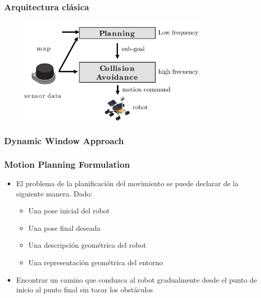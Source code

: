 \begin{frame}
	\frametitle{Arquitectura clásica}
	
	\begin{figure}[!h]
		\includegraphics[width=0.8\textwidth]{images/path_planning_architecture.pdf}
	\end{figure}
	
\end{frame}


\begin{frame}
	\frametitle{Dynamic Window Approach}
	
\end{frame}

\begin{frame}
	\frametitle{Motion Planning Formulation}

	\begin{itemize}
		\item El problema de la planificación del movimiento se puede declarar de la siguiente manera. Dado:
		\begin{itemize}
			\item Una pose inicial del robot
			\item Una pose final deseada
			\item Una descripción geométrica del robot
			\item Una representación geométrica del entorno
		\end{itemize}
		\item Encontrar un camino que conduzca al robot gradualmente desde el punto de inicio al punto final sin tocar los obstáculos
	\end{itemize}
\end{frame}

